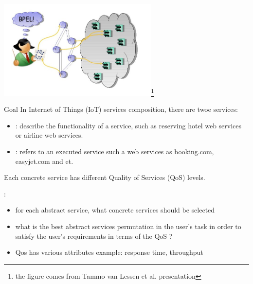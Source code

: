 \documentclass{beamer}
\newcommand{\remark}[1]{{\color{blue}{#1}}}
\newcommand{\PA}[1]{{\color{mygreen}{#1}}}
\begin{document}

\begin{frame}{}
\begin{center}
\includegraphics[width=0.6\textwidth]{iimas/ws-composition.jpg}\footnote{the figure comes from Tammo van Lessen et al. presentation}
\end{center}
\end{frame}


\begin{frame}{Goal}
In Internet of Things (IoT) services composition, there are twoe services:
\begin{itemize}
	\item \PA{Abstract Service}: describe the functionality of a service, such as reserving hotel web services or airline web services.
	\item \PA{Concrete Service}: refers to an executed service such a web services as booking.com, easyjet.com and et. 
\end{itemize}

\vspace{0.3cm}

Each concrete service has different Quality of Services (QoS) levels.\\

\vspace{0.3cm}

\remark{Question}: 

\begin{itemize}
	\item for each abstract service, what concrete services should be selected 
	\item what is the best abstract services permutation in the user’s task in
order to satisfy the user's requirements in terms of the QoS ?
	\item Qos has various attributes example: response time, throughput 
\end{itemize}

\end{frame}
\end{document}
